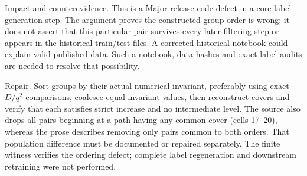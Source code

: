 \documentclass[10pt]{article}
\begin{document}
Impact and counterevidence. This is a Major release-code defect in a core label-generation step. The argument proves the constructed group order is wrong; it does not assert that this particular pair survives every later filtering step or appears in the historical train/test files. A corrected historical notebook could explain valid published data. Such a notebook, data hashes and exact label audits are needed to resolve that possibility.\par
Repair. Sort groups by their actual numerical invariant, preferably using exact \(D/q^2\) comparisons, coalesce equal invariant values, then reconstruct covers and verify that each satisfies strict increase and no intermediate level. The source also drops all pairs beginning at a path having any common cover (cells 17–20), whereas the prose describes removing only pairs common to both orders. That population difference must be documented or repaired separately. The finite witness verifies the ordering defect; complete label regeneration and downstream retraining were not performed.\par
\end{document}
